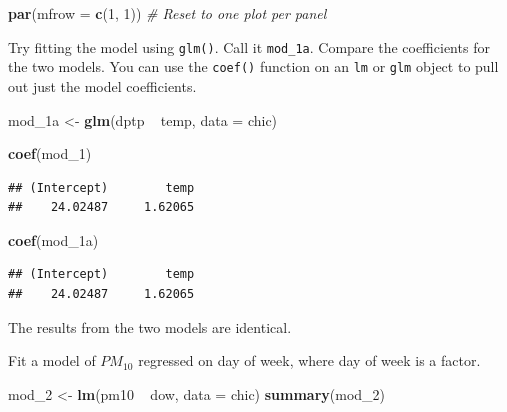 \documentclass[]{book}
\makeatletter
\newenvironment{Shaded}{\begin{snugshade}}{\end{snugshade}}
\newcommand{\KeywordTok}[1]{\textcolor[rgb]{0.13,0.29,0.53}{\textbf{{#1}}}}
\newcommand{\DataTypeTok}[1]{\textcolor[rgb]{0.13,0.29,0.53}{{#1}}}
\newcommand{\DecValTok}[1]{\textcolor[rgb]{0.00,0.00,0.81}{{#1}}}
\newcommand{\StringTok}[1]{\textcolor[rgb]{0.31,0.60,0.02}{{#1}}}
\newcommand{\CommentTok}[1]{\textcolor[rgb]{0.56,0.35,0.01}{\textit{{#1}}}}
\newcommand{\NormalTok}[1]{{#1}}
\newenvironment{kframe}{%
\medskip{}
\setlength{\fboxsep}{.8em}
 \def\at@end@of@kframe{}%
 \ifinner\ifhmode%
  \def\at@end@of@kframe{\end{minipage}}%
  \begin{minipage}{\columnwidth}%
 \fi\fi%
 \def\FrameCommand##1{\hskip\@totalleftmargin \hskip-\fboxsep
 \colorbox{shadecolor}{##1}\hskip-\fboxsep
     \hskip-\linewidth \hskip-\@totalleftmargin \hskip\columnwidth}%
 \MakeFramed {\advance\hsize-\width
   \@totalleftmargin\z@ \linewidth\hsize
   \@setminipage}}%
 {\par\unskip\endMakeFramed%
 \at@end@of@kframe}
\renewenvironment{Shaded}{\begin{kframe}}{\end{kframe}}
\makeatother
\begin{document}
\begin{Shaded}
\begin{Highlighting}[]
\KeywordTok{par}\NormalTok{(}\DataTypeTok{mfrow =} \KeywordTok{c}\NormalTok{(}\DecValTok{1}\NormalTok{, }\DecValTok{1}\NormalTok{)) }\CommentTok{# Reset to one plot per panel}
\end{Highlighting}
\end{Shaded}

Try fitting the model using \texttt{glm()}. Call it \texttt{mod\_1a}.
Compare the coefficients for the two models. You can use the
\texttt{coef()} function on an \texttt{lm} or \texttt{glm} object to
pull out just the model coefficients.

\begin{Shaded}
\begin{Highlighting}[]
\NormalTok{mod_1a <-}\StringTok{ }\KeywordTok{glm}\NormalTok{(dptp ~}\StringTok{ }\NormalTok{temp, }\DataTypeTok{data =} \NormalTok{chic)}

\KeywordTok{coef}\NormalTok{(mod_1)}
\end{Highlighting}
\end{Shaded}

\begin{verbatim}
## (Intercept)        temp 
##    24.02487     1.62065
\end{verbatim}

\begin{Shaded}
\begin{Highlighting}[]
\KeywordTok{coef}\NormalTok{(mod_1a)}
\end{Highlighting}
\end{Shaded}

\begin{verbatim}
## (Intercept)        temp 
##    24.02487     1.62065
\end{verbatim}

The results from the two models are identical.

Fit a model of \(PM_{10}\) regressed on day of week, where day of week
is a factor.

\begin{Shaded}
\begin{Highlighting}[]
\NormalTok{mod_2 <-}\StringTok{ }\KeywordTok{lm}\NormalTok{(pm10 ~}\StringTok{ }\NormalTok{dow, }\DataTypeTok{data =} \NormalTok{chic)}
\KeywordTok{summary}\NormalTok{(mod_2)}
\end{Highlighting}
\end{Shaded}
\end{document}
